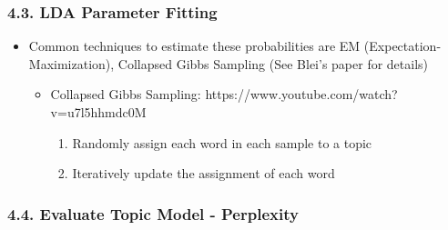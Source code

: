 \documentclass[11pt]{article}
\providecommand{\tightlist}{%
      \setlength{\itemsep}{0pt}\setlength{\parskip}{0pt}}
\begin{document}
    \hypertarget{lda-parameter-fitting}{%
\subsubsection{4.3. LDA Parameter Fitting}\label{lda-parameter-fitting}}

\begin{itemize}
\tightlist
\item
  Common techniques to estimate these probabilities are EM
  (Expectation-Maximization), Collapsed Gibbs Sampling (See Blei's paper
  for details)

  \begin{itemize}
  \tightlist
  \item
    Collapsed Gibbs Sampling:
    https://www.youtube.com/watch?v=u7l5hhmdc0M

    \begin{enumerate}
    \def\labelenumi{\arabic{enumi}.}
    \tightlist
    \item
      Randomly assign each word in each sample to a topic
    \item
      Iteratively update the assignment of each word 
    \end{enumerate}
  \end{itemize}
\end{itemize}

    \hypertarget{evaluate-topic-model---perplexity}{%
\subsubsection{4.4. Evaluate Topic Model -
Perplexity}\label{evaluate-topic-model---perplexity}}
\end{document}
